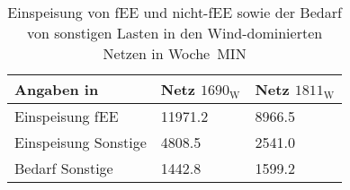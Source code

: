 {
\renewcommand{\arraystretch}{1.2}%
\begin{table}[H]
	\begin{center}
		\caption{Einspeisung von fEE und nicht-fEE sowie der Bedarf von sonstigen Lasten in den Wind-dominierten Netzen in Woche~MIN}
		\begin{tabu} to 0.6\textwidth {X[1.7] X[1, r] X[1, r]}
			\toprule
			Angaben in \si{\mwh}	& Netz \(1690_{\text{W}}\) & Netz \(1811_{\text{W}}\) \\ \midrule
			Einspeisung fEE      	& \num{11971.2}   & \num{8966.5}    \\
			Einspeisung Sonstige 	& \num{4808.5}    & \num{2541.0}    \\
			Bedarf Sonstige     	& \num{1442.8}    & \num{1599.2}    \\ \bottomrule
		\end{tabu}
		\label{tab:wind_dominated_week_a_char}
	\end{center}
	\vspace{-3mm}%
\end{table}
}